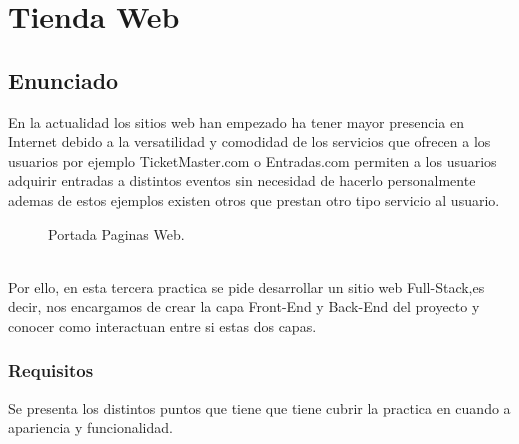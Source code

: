 \chapter{Tienda Web}
\section{Enunciado}
En la actualidad los sitios web han empezado ha tener mayor presencia en Internet debido a la versatilidad y comodidad de los servicios que ofrecen a los usuarios por ejemplo TicketMaster.com o Entradas.com permiten a los usuarios adquirir entradas a distintos eventos sin necesidad de hacerlo personalmente ademas de estos ejemplos existen otros que prestan otro tipo servicio al usuario.
\begin{figure}[!h]    
\centering
{}\hspace{1mm}
\caption{Portada Paginas Web.}
\label{fig:Portadas_Web.}
\end{figure}
\\Por ello, en esta tercera practica se pide desarrollar un sitio web Full-Stack,es decir, nos encargamos de crear la capa Front-End y Back-End del proyecto y conocer como interactuan entre si estas dos capas.
\subsection{Requisitos}
Se presenta los distintos puntos que tiene que tiene cubrir la practica en cuando a apariencia y funcionalidad.
